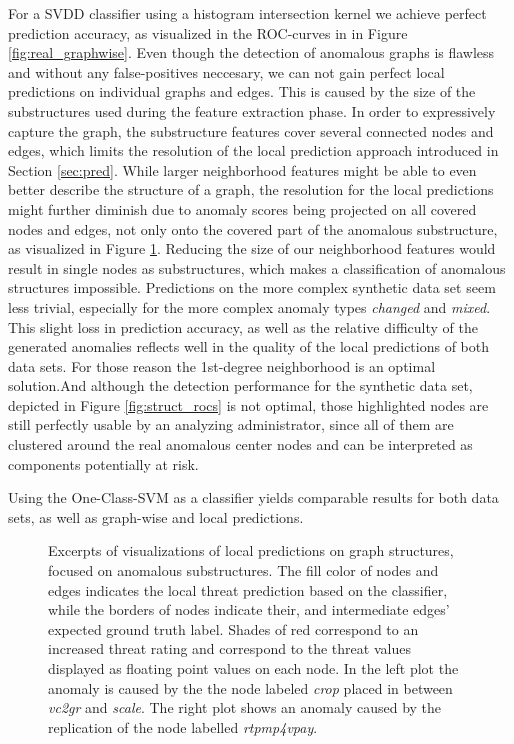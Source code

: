 \documentclass{llncs}
\begin{document}
For a SVDD classifier using a histogram intersection kernel we achieve perfect prediction accuracy, as visualized in the ROC-curves in in Figure \ref{fig:real_graphwise}. Even though the detection of anomalous graphs is flawless and without any false-positives neccesary, we can not gain perfect local predictions on individual graphs and edges. This is caused by the size of the substructures used during the feature extraction phase. In order to expressively capture the graph, the substructure features cover several connected nodes and edges, which limits the resolution of the local prediction approach introduced in Section \ref{sec:pred}. While larger neighborhood features might be able to even better describe the structure of a graph, the resolution for the local predictions might further diminish due to anomaly scores being projected on all covered nodes and edges, not only onto the covered part of the anomalous substructure, as visualized in Figure \ref{fig:localpreds}. Reducing the size of our neighborhood features would result in single nodes as substructures, which makes a classification of anomalous structures impossible. Predictions on the more complex synthetic data set seem less trivial, especially for the more complex anomaly types \emph{changed} and  \emph{mixed}. This slight loss in prediction accuracy, as well as the relative difficulty of the generated anomalies reflects well in the quality of the local predictions of both data sets. For those reason the 1st-degree neighborhood is an optimal solution.And although the detection performance for the synthetic data set, depicted in Figure \ref{fig:struct_rocs} is not optimal, those highlighted nodes are still perfectly usable by an analyzing administrator, since all of them are clustered around the real anomalous center nodes and can be interpreted as components potentially at risk.

Using the One-Class-SVM as a classifier yields comparable results for both data sets, as well as graph-wise and local predictions.

\begin{figure}[h]
\vspace{-2mm}
 \hfill

 \caption{Excerpts of visualizations of local predictions on graph structures, focused on anomalous substructures. The fill color of nodes and edges indicates the local threat prediction based on the classifier, while the borders of nodes indicate their, and intermediate edges' expected ground truth label. Shades of red correspond to an increased threat rating and correspond to the threat values displayed as floating point values on each node. In the left plot the anomaly is caused by the the node labeled \emph{crop} placed in between \emph{vc2gr} and \emph{scale}. The right plot shows an anomaly caused by the replication of the node labelled \emph{rtpmp4vpay}. }
 \label{fig:localpreds}
\end{figure}
\end{document}
